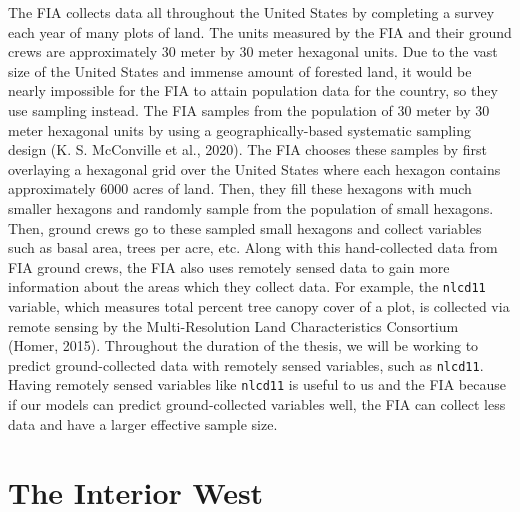 \documentclass[12pt,twoside]{reedthesis}
\begin{document}
The FIA collects data all throughout the United States by completing a survey each year of many plots of land. The units measured by the FIA and their ground crews are approximately 30 meter by 30 meter hexagonal units. Due to the vast size of the United States and immense amount of forested land, it would be nearly impossible for the FIA to attain population data for the country, so they use sampling instead. The FIA samples from the population of 30 meter by 30 meter hexagonal units by using a geographically-based systematic sampling design (K. S. McConville et al., 2020). The FIA chooses these samples by first overlaying a hexagonal grid over the United States where each hexagon contains approximately 6000 acres of land. Then, they fill these hexagons with much smaller hexagons and randomly sample from the population of small hexagons. Then, ground crews go to these sampled small hexagons and collect variables such as basal area, trees per acre, etc. Along with this hand-collected data from FIA ground crews, the FIA also uses remotely sensed data to gain more information about the areas which they collect data. For example, the \texttt{nlcd11} variable, which measures total percent tree canopy cover of a plot, is collected via remote sensing by the Multi-Resolution Land Characteristics Consortium (Homer, 2015). Throughout the duration of the thesis, we will be working to predict ground-collected data with remotely sensed variables, such as \texttt{nlcd11}. Having remotely sensed variables like \texttt{nlcd11} is useful to us and the FIA because if our models can predict ground-collected variables well, the FIA can collect less data and have a larger effective sample size.
\clearpage

\hypertarget{the-interior-west}{%
\section{The Interior West}\label{the-interior-west}}
\end{document}
